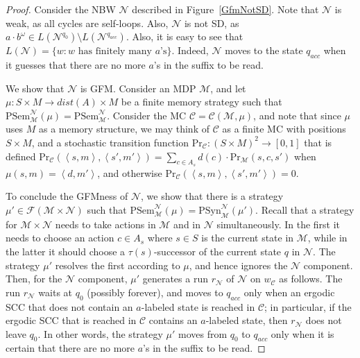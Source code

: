 \documentclass[10pt,a4paper]{amsart}
\theoremstyle{definition}
\numberwithin{equation}{section}
\newcommand{\C}{{\mathcal C}}
\newcommand{\M}{{\mathcal M}}
\newcommand{\F}{{\mathcal F}}
\newcommand{\zug}[1]{\left\langle #1 \right\rangle}
\renewcommand{\Pr}{\mathrm{Pr}}
\newcommand{\N}{{\mathcal N}}
\begin{document}
\begin{proof}
		Consider the NBW $\N$ described in Figure~\ref{GfmNotSD}. Note that $\N$ is weak, as all cycles are self-loops. Also, $\N$ is not SD, as $a\cdot b^\omega \in L( \N^{q_0}) \setminus L(\N^{q_{acc}})$. 
		Also, it is easy to see that $L(\N) = \{w: \text{$w$ has finitely many $a$'s}\}$. Indeed, $\N$ moves to the state $q_{acc}$ when it guesses that there are no more $a$'s in the suffix to be read.
		
		We show that $\N$ is GFM. 
		Consider an MDP $\M$, and let $\mu: S\times M \to dist(A) \times M$ be a finite memory strategy such that $\mathrm{PSem}^\N_\M(\mu) = \mathrm{PSem}^\N_{\M}$.  Consider the MC $\C=\C(\M,\mu)$, and  note that since $\mu$ uses $M$ as a memory structure, we may think of $\C$ as a finite MC with positions $S\times M$, and a stochastic transition function $\Pr_\C:(S\times M)^2\rightarrow[0,1]$ that is defined $\Pr_\C(\zug{s,m},\zug{s',m'})=\sum_{c\in A_s}d(c) \cdot \Pr_{\M}(s,c,s')$ when $\mu(s,m)=\zug{d,m'}$, and otherwise $\Pr_\C(\zug{s,m},\zug{s',m'})=0$. 
		
		To conclude the GFMness of $\N$, we show that there is a strategy $\mu'\in \F(\M\times \N)$ such that $\mathrm{PSem}^\N_\M(\mu) = \mathrm{PSyn}^\N_\M(\mu')$. 	
		Recall that a strategy for $\M\times \N$ needs to take actions in $\M$ and in $\N$ simultaneously.  In the first it needs to choose an action $c\in A_s$ where $s\in S$ is the current state in $\M$, while in the latter it should choose a $\tau(s)$-successor of the current state $q$ in $\N$. The strategy $\mu'$ resolves the first according to $\mu$, and hence ignores the $\N$ component. Then, for the $\N$ component, $\mu'$ generates a run $r_\N$ of $\N$ on $w_\C$ as follows. The run $r_\N$ waits at $q_0$ (possibly forever), and moves to $q_{acc}$ only when an ergodic SCC that does not contain an $a$-labeled state is reached in $\C$; in particular, if the ergodic SCC that is reached in $\C$ contains an $a$-labeled state, then $r_\N$ does not leave $q_0$. In other words, the strategy $\mu'$ moves from $q_0$ to $q_{acc}$ only when it is certain that there are no more $a$'s in the suffix to be read.
	

\end{proof}
\end{document}
